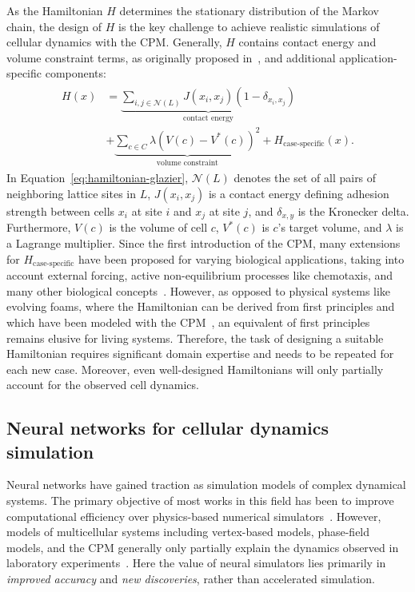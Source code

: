 As the Hamiltonian $H$ determines the stationary distribution of the Markov chain, the design of $H$ is the key challenge to achieve realistic simulations of cellular dynamics with the CPM. Generally, $H$ contains contact energy and volume constraint terms, as originally proposed in~\cite{Graner1992}, and additional application-specific components:
\begin{gather}
\begin{aligned}\label{eq:hamiltonian-glazier}
    H(x) &= \underbrace{\sum_{i,j \in \mathcal{N}(L)} J\left(x_i, x_j \right) \left(1-\delta_{x_i, x_j}\right)}_{\text{contact energy}}\\
    &+ \underbrace{\sum_{c \in C} \lambda \left(V(c) - V^*(c)\right)^2}_{\text{volume constraint}} + H_{\text{case-specific}}(x).
\end{aligned}
\end{gather}
In Equation~\ref{eq:hamiltonian-glazier}, $\mathcal{N}(L)$ denotes the set of all pairs of neighboring lattice sites in $L$, $J\left(x_i, x_j\right)$ is a contact energy defining adhesion strength between cells $x_i$ at site $i$ and $x_j$ at site $j$, and $\delta_{x, y}$ is the Kronecker delta. Furthermore, $V(c)$ is the volume of cell $c$, $V^*(c)$ is $c$'s target volume, and $\lambda$ is a Lagrange multiplier. Since the first introduction of the CPM, many extensions for $H_\text{case-specific}$ have been proposed for varying biological applications, taking into account external forcing, active non-equilibrium processes like chemotaxis, and many other biological concepts~\cite{Hirashima2017}. However, as opposed to physical systems like evolving foams, where the Hamiltonian can be derived from first principles and which have been modeled with the CPM~\cite{Graner2000}, an equivalent of first principles remains elusive for living systems. Therefore, the task of designing a suitable Hamiltonian requires significant domain expertise and needs to be repeated for each new case. Moreover, even well-designed Hamiltonians will only partially account for the observed cell dynamics.

\subsection{Neural networks for cellular dynamics simulation}

Neural networks have gained traction as simulation models of complex dynamical systems. The primary objective of most works in this field has been to improve computational efficiency over physics-based numerical simulators~\cite{azizzadenesheli2024neuralop,fno, kochov2021mlcompfluid, gupta2023towards}. However, models of multicellular systems including vertex-based models, phase-field models, and the CPM generally only partially explain the dynamics observed in laboratory experiments~\cite{alert2020, Bruckner2024}. 
Here the value of neural simulators lies primarily in \emph{improved accuracy} and \emph{new discoveries}, rather than accelerated simulation. 

